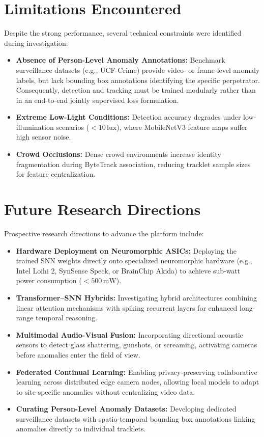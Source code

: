 \documentclass[12pt,a4paper]{report}
\begin{document}
\section{Limitations Encountered}
Despite the strong performance, several technical constraints were identified during investigation:
\begin{itemize}
    \item \textbf{Absence of Person-Level Anomaly Annotations:} Benchmark surveillance datasets (e.g., UCF-Crime) provide video- or frame-level anomaly labels, but lack bounding box annotations identifying the specific perpetrator. Consequently, detection and tracking must be trained modularly rather than in an end-to-end jointly supervised loss formulation.
    \item \textbf{Extreme Low-Light Conditions:} Detection accuracy degrades under low-illumination scenarios ($< 10\,\text{lux}$), where MobileNetV3 feature maps suffer high sensor noise.
    \item \textbf{Crowd Occlusions:} Dense crowd environments increase identity fragmentation during ByteTrack association, reducing tracklet sample sizes for feature centralization.
\end{itemize}

\section{Future Research Directions}
Prospective research directions to advance the platform include:
\begin{itemize}
    \item \textbf{Hardware Deployment on Neuromorphic ASICs:} Deploying the trained SNN weights directly onto specialized neuromorphic hardware (e.g., Intel Loihi 2, SynSense Speck, or BrainChip Akida) to achieve sub-watt power consumption ($< 500\,\text{mW}$).
    \item \textbf{Transformer--SNN Hybrids:} Investigating hybrid architectures combining linear attention mechanisms with spiking recurrent layers for enhanced long-range temporal reasoning.
    \item \textbf{Multimodal Audio-Visual Fusion:} Incorporating directional acoustic sensors to detect glass shattering, gunshots, or screaming, activating cameras before anomalies enter the field of view.
    \item \textbf{Federated Continual Learning:} Enabling privacy-preserving collaborative learning across distributed edge camera nodes, allowing local models to adapt to site-specific anomalies without centralizing video data.
    \item \textbf{Curating Person-Level Anomaly Datasets:} Developing dedicated surveillance datasets with spatio-temporal bounding box annotations linking anomalies directly to individual tracklets.
\end{itemize}
\end{document}
